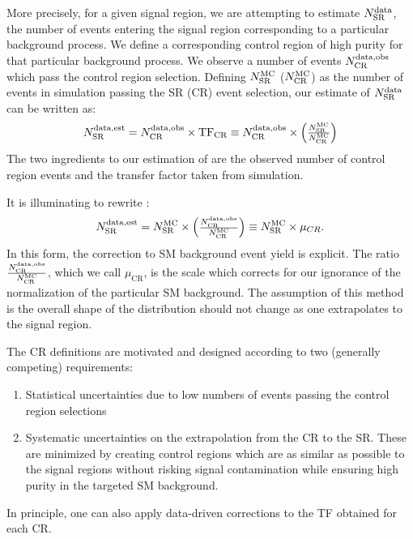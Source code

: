 More precisely, for a given signal region, we are attempting to estimate $\ntext{SR}{data}$, the number of events entering the signal region corresponding to a particular background process.
We define a corresponding control region of high purity for that particular background process.
We observe a number of events $\ntext{CR}{data,obs}$ which pass the control region selection.
Defining $\ntext{SR}{MC}$ ($\ntext{CR}{MC}$) as the number of events in simulation passing the SR (CR) event selection, our estimate of $\ntext{SR}{data}$ can be written as:
\begin{align}\label{eq:bkg_est}
\ntext{SR}{data,est} = \ntext{CR}{data,obs} \times \text{TF}_{\text{CR}} \equiv \ntext{CR}{data,obs} \times  \begin{pmatrix} \frac{ \ntext{SR}{MC} }{ \ntext{CR}{MC} } \end{pmatrix}
\end{align}
The two ingredients to our estimation of  are the observed number of control region events  and the transfer factor taken from simulation.

It is illuminating to rewrite :
\begin{align}\label{eq:bkg_est_simple}
\ntext{SR}{data,est} = \ntext{SR}{MC} \times  \begin{pmatrix} \frac{\ntext{CR}{data,obs}  }{ \ntext{CR}{MC} } \end{pmatrix} \equiv \ntext{SR}{MC} \times \mu_{CR}.
\end{align}
In this form, the correction to SM background event yield is explicit.
The ratio $\frac{\ntext{CR}{data,obs}}{ \ntext{CR}{MC} }$, which we call $\mu_{\text{CR}}$, is the scale which corrects for our ignorance of the normalization of the particular SM background.
The assumption of this method is the overall shape of the distribution should not change as one extrapolates to the signal region.

The CR definitions are motivated and designed according to two (generally competing) requirements:
\begin{enumerate}
\item Statistical uncertainties due to low numbers of events passing the control region selections
\item Systematic uncertainties on the extrapolation from the CR to the SR.  These are minimized by creating control regions which are as similar as possible to the signal regions without risking signal contamination while ensuring high purity in the targeted SM background.
\end{enumerate}
In principle, one can also apply data-driven corrections to the TF obtained for each CR.

